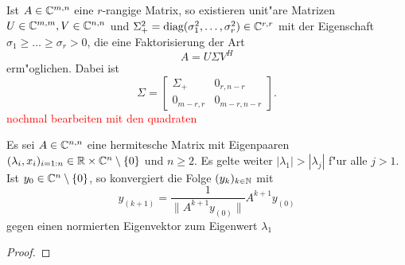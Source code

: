 \begin{thm}\label{thm:svd}
Ist $A\in\mathbb{C}^{m,n}$ eine $r$-rangige Matrix, so existieren unit"are Matrizen $U\in\mathbb{C}^{m,m}, V\in\mathbb{C}^{n,n}$
und $\Sigma^2_+ =\text{diag}(\sigma^2_1,\ldots,\sigma^2_r)\in\mathbb{C}^{r,r}$ mit der Eigenschaft $\sigma_1 \ge \ldots \ge \sigma_r > 0$, die
eine Faktorisierung der Art
\[
A = U \Sigma V^H
\]
erm"oglichen. Dabei ist
\[
\Sigma = \begin{bmatrix} \Sigma_+ & 0_{r,n-r} \\
0_{m-r,r} & 0_{m-r,n-r} \end{bmatrix}.
\]
\textcolor{red}{nochmal bearbeiten mit den quadraten}

\end{thm}



\begin{thm} Es sei $A\in\mathbb{C}^{n,n}$ eine hermitesche Matrix mit Eigenpaaren $(\lambda_i,x_i)_{i=1:n} \in \mathbb{R}\times\mathbb{C}^n \setminus\{0\}$ und $n\ge 2$.
Es gelte weiter $|\lambda_1| > |\lambda_j|$ f"ur alle
$j > 1$. Ist $y_0 \in\mathbb{C}^n \setminus\{0\}$, so konvergiert die Folge
$(y_k)_{k\in\mathbb{N}}$ mit
\[
y_{(k+1)} = \frac{1}{\|A^{k+1} y_{(0)}\|} A^{k+1}y_{(0)}
\]
gegen einen normierten Eigenvektor zum Eigenwert $\lambda_1$
\end{thm}

\begin{proof}

\end{proof}
